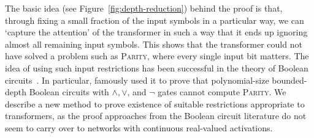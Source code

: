 \documentclass[11pt,a4paper]{article}
\begin{document}
The basic idea (see Figure~\ref{fig:depth-reduction}) behind the proof is that, through fixing a small fraction of the input symbols in a particular way, we can `capture the attention' of the transformer in such a way that it ends up ignoring almost all remaining input symbols.
This shows that the transformer could not have solved a problem such as \textsc{Parity}, where every single input bit matters.
The idea of using such input restrictions has been successful in the theory of Boolean circuits~\cite{furst1984parity,yao1986separating,hastad1994optimal}.
In particular, \citet{furst1984parity}  famously used it to prove that polynomial-size bounded-depth Boolean circuits with $\wedge, \vee$, and $\neg$ gates cannot compute \textsc{Parity}.
We describe a new method to prove existence of suitable restrictions appropriate to transformers, as the proof approaches from the Boolean circuit literature do not seem to carry over to networks with continuous real-valued activations. %




\end{document}
